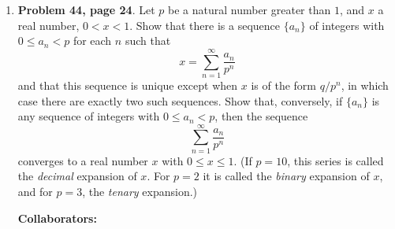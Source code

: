 \documentclass{article}%
\newenvironment{proof}[1][Proof]{\textbf{#1.} }{\ \rule{0.5em}{0.5em}}
\begin{document}
\begin{enumerate}
\begin{proof}
For the general case, it is the same using the similar skills.\\[5pt]
\textbf{Nested Set theorem $\to$ Completeness Axiom theorem:}\\
Let $E$ be a nonempty and upper-bounded set of real numbers, and let $T$ is the set consists of all upper bounders of $E$. Pick $a_1\notin T$, and $b_1 \notin T$, then $a_1 < b_1$.
If $\frac{a_1+b_1}{2} \in T$, then $[a_2, b_2] = \left[a_1, \frac{a_1+b_1}{2}\right]$; else $[a_2, b_2] = \left[\frac{a_1+b_1}{2}, b_1\right]$. 
Construct $[a_3, b_3], \cdots$ as above, we can get a nested set series $\{[a_n, b_n]\}$, satisfying $a_n\notin T, b_n\in T$. With Nested Set theorem, there exist a real number $x$ belongs to all these closed sets, and $\lim_{n\to\infty}a_n = \lim_{n\to\infty}b_n = x$.\\
If $x\notin T$, then exists $y\in E$, s.t. $x < y$. So $b_n < x$ when $n$ is large enough. This makes a contradiction with $b_n\in T$, so $x\in T$. On the othe hand, if there exists $z\in T$, s.t. $z < x$, then $a_n > z$ when n is large enough. This makes a contradiction with $a_n\in E$. So $x$ is the supremum of $E$.
\end{proof}

\bigskip

\item \textbf{Problem 44, page 24}.  Let $p$ be a natural number greater than $1$, and $x$ a real number, $0<x<1$.  Show that there is a sequence $\{a_n\}$ of integers with $0\leq a_n < p$ for each $n$ such that \[
x = \sum_{n=1}^{\infty} \frac{a_n}{p^n} \]and that this sequence is unique except when $x$ is of the form $q/p^n$, in which case there are exactly two such sequences.  Show that, conversely, if $\{a_n\}$ is any sequence of integers with $0\leq a_n < p$, then the sequence \[\sum_{n=1}^{\infty} \frac{a_n}{p^n} \]converges to a real number $x$ with $0\leq x \leq 1$. (If $p = 10$, this series is called the \emph{decimal} expansion of $x$.  For $p = 2$ it is called the \emph{binary} expansion of $x$, and for $p = 3$, the \emph{tenary} expansion.) 


\bigskip
\textbf{Collaborators:}\\
\smallskip
 

\end{enumerate}
\end{document}
